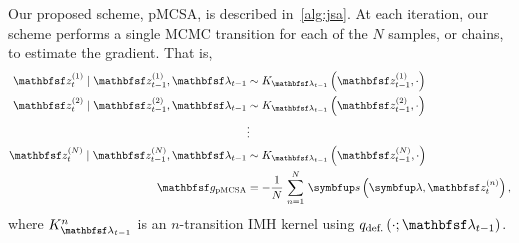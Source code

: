 \begin{proofEnd}

  Our proposed scheme, pMCSA, is described in~\cref{alg:jsa}. 
  At each iteration, our scheme performs a single MCMC transition for each of the \(N\) samples, or chains, to estimate the gradient.
  That is,
  \begin{align*}
    \rvvz^{(1)}_{t} \mid \rvvz_{t-1}^{(1)}, \rvvlambda_{t-1} &\sim K_{\rvvlambda_{t-1}}\left(\rvvz_{t-1}^{(1)}, \cdot\right) \\
    \rvvz^{(2)}_{t} \mid \rvvz_{t-1}^{(2)}, \rvvlambda_{t-1}  &\sim K_{\rvvlambda_{t-1}}\left(\rvvz_{t-1}^{(2)}, \cdot\right) \\
    &\vdots
    \\
    \rvvz^{(N)}_{t} \mid \rvvz^{(N)}_{t-1}, \rvvlambda_{t-1}  &\sim K_{\rvvlambda_{t-1}}\left(\rvvz_{t-1}^{(N)}, \cdot\right)
    \\
    \rvvg_{\text{pMCSA}} &= -\frac{1}{N}\,\sum^{N}_{n=1} \, \vs\left(\vlambda, \rvvz^{(n)}_t\right),
  \end{align*}
  where \(K_{\rvvlambda_{t-1}}^n\) is an \(n\)-transition IMH kernel using \(q_{\text{def.}}\left(\cdot; \rvvlambda_{t-1}\right)\).


\end{proofEnd}
